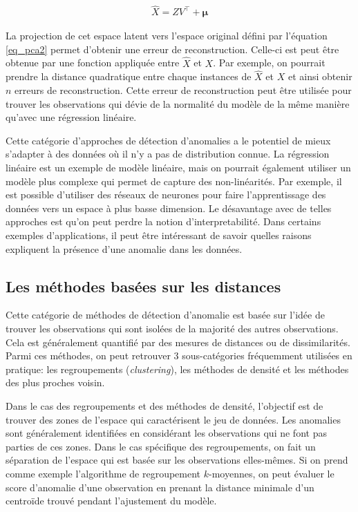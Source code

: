   \begin{gather}  \label{eq_pca2}
 \hat{X} = ZV^\top + \boldsymbol{\mu}
 \end{gather}
 
La projection de cet espace latent vers l'espace original défini par l'équation \ref{eq_pca2} permet d'obtenir une erreur de reconstruction. Celle-ci est peut être obtenue par une fonction appliquée entre $\hat{X}$ et $X$. Par exemple, on pourrait prendre la distance quadratique entre chaque instances de $\hat{X}$ et $X$ et ainsi obtenir $n$ erreurs de reconstruction. Cette erreur de reconstruction peut être utilisée pour trouver les observations qui dévie de la normalité du modèle de la même manière qu'avec une régression linéaire.
  
Cette catégorie d'approches de détection d'anomalies a le potentiel de mieux s'adapter à des données où il n'y a pas de distribution connue. La régression linéaire est un exemple de modèle linéaire, mais on pourrait également utiliser un modèle plus complexe qui permet de capture des non-linéarités. Par exemple, il est possible d'utiliser des réseaux de neurones pour faire l'apprentissage des données vers un espace à plus basse dimension. Le désavantage avec de telles approches est qu'on peut perdre la notion d'interpretabilité. Dans certains exemples d'applications, il peut être intéressant de savoir quelles raisons expliquent la présence d'une anomalie dans les données.

\subsection{Les méthodes basées sur les distances}

Cette catégorie de méthodes de détection d'anomalie est basée sur l'idée de trouver les observations qui sont isolées de la majorité des autres observations. Cela est généralement quantifié par des mesures de distances ou de dissimilarités. Parmi ces méthodes, on peut retrouver 3 sous-catégories fréquemment utilisées en pratique: les regroupements (\textit{clustering}), les méthodes de densité et les méthodes des plus proches voisin.

Dans le cas des regroupements et des méthodes de densité, l'objectif est de trouver des zones de l'espace qui caractérisent le jeu de données. Les anomalies sont généralement identifiées en considérant les observations qui ne font pas parties de ces zones. Dans le cas spécifique des regroupements, on fait un séparation de l'espace qui est basée sur les observations elles-mêmes. Si on prend comme exemple l'algorithme de regroupement $k$-moyennes, on peut évaluer le score d'anomalie d'une observation en prenant la distance minimale d'un centroïde trouvé pendant l'ajustement du modèle.

